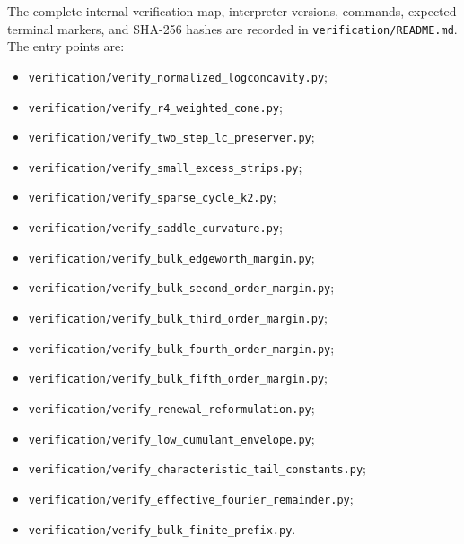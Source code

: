 \documentclass[11pt]{article}
\numberwithin{equation}{section}
\begin{document}
The complete internal verification map, interpreter versions, commands, expected terminal
markers, and SHA-256 hashes are recorded in
\texttt{verification/README.md}. The entry points are:

\begin{itemize}
\item \texttt{verification/\allowbreak{}verify\_\allowbreak{}normalized\_\allowbreak{}logconcavity.py};
\item \texttt{verification/\allowbreak{}verify\_\allowbreak{}r4\_\allowbreak{}weighted\_\allowbreak{}cone.py};
\item \texttt{verification/\allowbreak{}verify\_\allowbreak{}two\_\allowbreak{}step\_\allowbreak{}lc\_\allowbreak{}preserver.py};
\item \texttt{verification/\allowbreak{}verify\_\allowbreak{}small\_\allowbreak{}excess\_\allowbreak{}strips.py};
\item \texttt{verification/\allowbreak{}verify\_\allowbreak{}sparse\_\allowbreak{}cycle\_\allowbreak{}k2.py};
\item \texttt{verification/\allowbreak{}verify\_\allowbreak{}saddle\_\allowbreak{}curvature.py};
\item \texttt{verification/\allowbreak{}verify\_\allowbreak{}bulk\_\allowbreak{}edgeworth\_\allowbreak{}margin.py};
\item \texttt{verification/\allowbreak{}verify\_\allowbreak{}bulk\_\allowbreak{}second\_\allowbreak{}order\_\allowbreak{}margin.py};
\item \texttt{verification/\allowbreak{}verify\_\allowbreak{}bulk\_\allowbreak{}third\_\allowbreak{}order\_\allowbreak{}margin.py};
\item \texttt{verification/\allowbreak{}verify\_\allowbreak{}bulk\_\allowbreak{}fourth\_\allowbreak{}order\_\allowbreak{}margin.py};
\item \texttt{verification/\allowbreak{}verify\_\allowbreak{}bulk\_\allowbreak{}fifth\_\allowbreak{}order\_\allowbreak{}margin.py};
\item \texttt{verification/\allowbreak{}verify\_\allowbreak{}renewal\_\allowbreak{}reformulation.py};
\item \texttt{verification/\allowbreak{}verify\_\allowbreak{}low\_\allowbreak{}cumulant\_\allowbreak{}envelope.py};
\item \texttt{verification/\allowbreak{}verify\_\allowbreak{}characteristic\_\allowbreak{}tail\_\allowbreak{}constants.py};
\item \texttt{verification/\allowbreak{}verify\_\allowbreak{}effective\_\allowbreak{}fourier\_\allowbreak{}remainder.py};
\item \texttt{verification/\allowbreak{}verify\_\allowbreak{}bulk\_\allowbreak{}finite\_\allowbreak{}prefix.py}.

\end{itemize}
\end{document}
